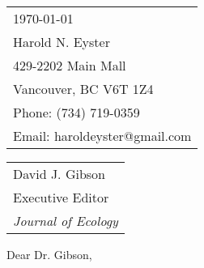 \documentclass{article}
\begin{document}
	
	
	\null\hfill
	\begin{tabular}{l@{}}
		\today \\[\jot]
		Harold N. Eyster\\
		429-2202 Main Mall \\
		Vancouver, BC V6T 1Z4 \\
		Phone: (734) 719-0359 \\
		Email: haroldeyster@gmail.com
	\end{tabular}  
	
	\medskip
	
	\begin{tabular}{@{}l}
		David J. Gibson \\
		Executive Editor \\
		\textit{Journal of Ecology} \\
	\end{tabular}
	
	\bigskip
	
	Dear Dr. Gibson,
	
\end{document}
